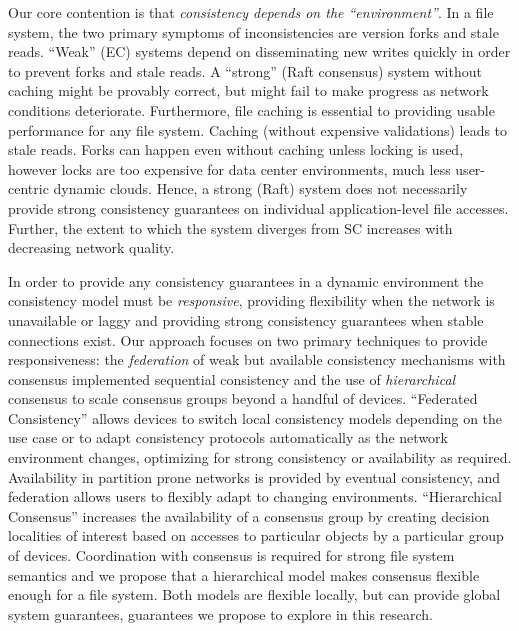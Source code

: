 \documentclass{article}
\newcommand{\pjk}[1]{{\bf
    [\marginpar[\hbox{{\textcolor{blue}{pjk}}\raisebox{0ex}{\Huge $\rightarrow$}}]%
{\hbox{\raisebox{0ex}{\Huge $\leftarrow$}{\textcolor{blue}{pjk}}}}\textcolor{blue}{#1}]}}
\renewcommand{\pjk}[1]{\textcolor{blue}{[#1]}}
\begin{document}
Our core contention is that \emph{consistency depends on the
``environment''}. In a file system, the two primary symptoms of inconsistencies are version forks and stale reads. ``Weak'' (EC) systems depend on disseminating new writes quickly in order to prevent forks and stale reads. A ``strong'' (Raft consensus) system without caching might be provably correct, but might fail to make progress as network conditions deteriorate. Furthermore, file caching is essential to providing usable performance for any file system. Caching (without expensive validations) leads to stale reads. Forks can happen even without caching unless locking is used, however locks are too expensive for data center environments, much less user-centric dynamic clouds. Hence, a strong (Raft) system does not necessarily provide strong consistency guarantees on individual application-level file accesses. Further, the extent to which the system diverges from SC increases with decreasing network quality.


In order to provide any consistency guarantees in a dynamic environment the consistency model must be \textit{responsive}, providing flexibility when the network is unavailable or laggy and providing strong consistency guarantees when stable connections exist. Our approach focuses on two primary techniques to provide responsiveness: the \textit{federation} of weak but available consistency mechanisms with consensus implemented sequential consistency and the use of \textit{hierarchical} consensus to scale consensus groups beyond a handful of devices. ``Federated Consistency'' allows devices to switch local consistency models depending on the use case or to adapt consistency protocols automatically as the network environment changes, optimizing for strong consistency or availability as required. Availability in partition prone networks is provided by eventual consistency, and federation allows users to flexibly adapt to changing environments. ``Hierarchical Consensus'' increases the availability of a consensus group by creating decision localities of interest based on accesses to particular objects by a particular group of devices. Coordination with consensus is required for strong file system semantics and we propose that a hierarchical model makes consensus flexible enough for a file system. Both models are flexible locally, but can provide global system guarantees, guarantees we propose to explore in this research.
\end{document}
